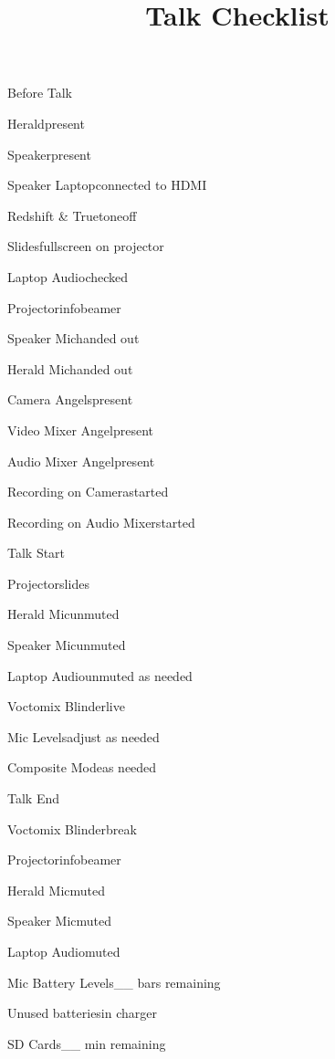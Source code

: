 \def\papersize{5}




\title{Talk Checklist}

\begin{checklist}{Before Talk}
  \item{Herald}{present}
  \item{Speaker}{present}
  \item{Speaker Laptop}{connected to HDMI}
  \item{Redshift \& Truetone}{off}
  \item{Slides}{fullscreen on projector}
  \item{Laptop Audio}{checked}
  \item{Projector}{infobeamer}
  \item{Speaker Mic}{handed out}
  \item{Herald Mic}{handed out}
  \item{Camera Angels}{present}
  \item{Video Mixer Angel}{present}
  \item{Audio Mixer Angel}{present}
  \item{Recording on Camera}{started}
  \item{Recording on Audio Mixer}{started}
\end{checklist}

\begin{checklist}{Talk Start}
  \item{Projector}{slides}
  \item{Herald Mic}{unmuted}
  \item{Speaker Mic}{unmuted}
  \item{Laptop Audio}{unmuted as needed}
  \item{Voctomix Blinder}{live}
  \item{Mic Levels}{adjust as needed}

  \item{Composite Mode}{as needed}
\end{checklist}

\begin{checklist}{Talk End}
  \item{Voctomix Blinder}{break}
  \item{Projector}{infobeamer}
  \item{Herald Mic}{muted}
  \item{Speaker Mic}{muted}
  \item{Laptop Audio}{muted}
  \item{Mic Battery Levels}{\_\_ bars remaining}
  \item{Unused batteries}{in charger}
  \item{SD Cards}{\_\_ min remaining}
\end{checklist}


